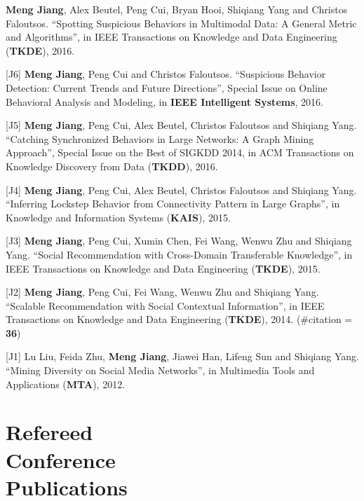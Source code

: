 \documentclass[margin, 10pt]{res}
\begin{document}
\begin{resume}
[J7] \textbf{Meng Jiang}, Alex Beutel, Peng Cui, Bryan Hooi, Shiqiang Yang and Christos Faloutsos. ``Spotting Suspicious Behaviors in Multimodal Data: A General Metric and Algorithms'', in IEEE Transactions on Knowledge and Data Engineering (\textbf{TKDE}), 2016. %

[J6] \textbf{Meng Jiang}, Peng Cui and Christos Faloutsos. ``Suspicious Behavior Detection: Current Trends and Future Directions'', Special Issue on Online Behavioral Analysis and Modeling, in \textbf{IEEE Intelligent Systems}, 2016. %

[J5] \textbf{Meng Jiang}, Peng Cui, Alex Beutel, Christos Faloutsos and Shiqiang Yang. ``Catching Synchronized Behaviors in Large Networks: A Graph Mining Approach'', Special Issue on the Best of SIGKDD 2014, in ACM Transactions on Knowledge Discovery from Data (\textbf{TKDD}), 2016. %

[J4] \textbf{Meng Jiang}, Peng Cui, Alex Beutel, Christos Faloutsos and Shiqiang Yang. ``Inferring Lockstep Behavior from Connectivity Pattern in Large Graphs'', in Knowledge and Information Systems (\textbf{KAIS}), 2015. %

[J3] \textbf{Meng Jiang}, Peng Cui, Xumin Chen, Fei Wang, Wenwu Zhu and Shiqiang Yang. ``Social Recommendation with Cross-Domain Transferable Knowledge'', in IEEE Transactions on Knowledge and Data Engineering (\textbf{TKDE}), 2015. %

[J2] \textbf{Meng Jiang}, Peng Cui, Fei Wang, Wenwu Zhu and Shiqiang Yang. ``Scalable Recommendation with Social Contextual Information'', in IEEE Transactions on Knowledge and Data Engineering (\textbf{TKDE}), 2014. (\#citation = \textbf{36}) %

[J1] Lu Liu, Feida Zhu, \textbf{Meng Jiang}, Jiawei Han, Lifeng Sun and Shiqiang Yang. ``Mining Diversity on Social Media Networks'', in Multimedia Tools and Applications (\textbf{MTA}), 2012. %


\section{Refereed \\ Conference \\ Publications}


\end{resume}
\end{document}
